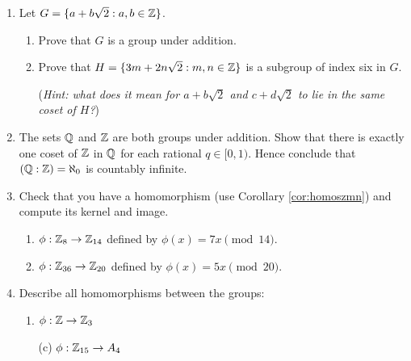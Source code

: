 \begin{exercises}
\begin{enumerate}
			
		\item\label{exs:zsqrt2subgroup} Let $G=\{a+b\sqrt 2:a,b\in\mathbb{Z}\}$.
		\begin{enumerate}
		  \item Prove that $G$ is a group under addition.
		  \item Prove that $H=\{3m+2n\sqrt 2:m,n\in\mathbb{Z}\}$ is a subgroup of index six in $G$.\par
		  (\emph{Hint: what does it mean for $a+b\sqrt 2$ and $c+d\sqrt 2$ to lie in the same coset of $H$?})
		\end{enumerate}
	  
	  \item\label{exs:zqindex} The sets $\mathbb{Q}$ and $\mathbb{Z}$ are both groups under addition. Show that there is exactly one coset of $\mathbb{Z}$ in $\mathbb{Q}$ for each rational $q\in[0,1)$. Hence conclude that $(\mathbb{Q}:\mathbb{Z})=\aleph_0$ is countably infinite.
		

	  \item Check that you have a homomorphism (use Corollary \ref{cor:homoszmn}) and compute its kernel and image.
	  \begin{enumerate}
	    \item $\phi:\mathbb{Z}_{8}\to\mathbb{Z}_{14}$ defined by $\phi(x)=7x\pmod{14}$.
	    
	    \item $\phi:\mathbb{Z}_{36}\to\mathbb{Z}_{20}$ defined by $\phi(x)=5x\pmod{20}$.
		\end{enumerate}
	
		
		\item Describe all homomorphisms between the groups:
		\begin{enumerate}
		  \item {}\lstsp $\phi:\mathbb{Z}\to\mathbb{Z}_3$ 
		  \item[(c)] \lstsp $\phi:\mathbb{Z}_{15}\to A_4$
		\end{enumerate}
		

\end{enumerate}
\end{exercises}
